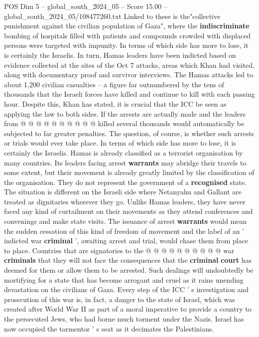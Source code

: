 \begin{textsample}{POS Dim 5 – global\_south\_2024\_05 – Score 15.00 – global\_south\_2024\_05/108477260.txt}
Linked to these is the"collective punishment against the civilian population of Gaza", where the \textbf{indiscriminate} bombing of hospitals filled with patients and compounds crowded with displaced persons were targeted with impunity.
In terms of which side has more to lose, it is certainly the Israelis.
In turn, Hamas leaders have been indicted based on evidence collected at the sites of the Oct 7 attacks, areas which Khan had visited, along with documentary proof and survivor interviews.
The Hamas attacks led to about 1,200 civilian casualties -- a figure far outnumbered by the tens of thousands that the Israeli forces have killed and continue to kill with each passing hour.
Despite this, Khan has stated, it is crucial that the ICC be seen as applying the law to both sides.
If the arrests are actually made and the leaders from @ @ @ @ @ @ @ @ @ @ killed several thousands would automatically be subjected to far greater penalties.
The question, of course, is whether such arrests or trials would ever take place.
In terms of which side has more to lose, it is certainly the Israelis.
Hamas is already classified as a terrorist organisation by many countries.
Its leaders facing arrest \textbf{warrants} may abridge their travels to some extent, but their movement is already greatly limited by the classification of the organisation.
They do not represent the government of a \textbf{recognised} state.
The situation is different on the Israeli side where Netanyahu and Gallant are treated as dignitaries wherever they go.
Unlike Hamas leaders, they have never faced any kind of curtailment on their movements as they attend conferences and convenings and make state visits.
The issuance of arrest \textbf{warrants} would mean the sudden cessation of this kind of freedom of movement and the label of an ' indicted war \textbf{criminal} ', awaiting arrest and trial, would chase them from place to place.
Countries that are signatories to the @ @ @ @ @ @ @ @ @ @ war \textbf{criminals} that they will not face the consequences that the \textbf{criminal} \textbf{court} has deemed for them or allow them to be arrested.
Such dealings will undoubtedly be mortifying for a state that has become arrogant and cruel as it rains unending devastation on the civilians of Gaza.
Every step of the ICC ' s investigation and prosecution of this war is, in fact, a danger to the state of Israel, which was created after World War II as part of a moral imperative to provide a country to the persecuted Jews, who had borne much torment under the Nazis.
Israel has now occupied the tormentor ' s seat as it decimates the Palestinians.

\end{textsample}
